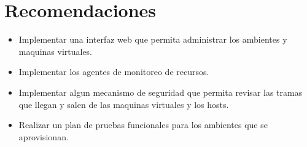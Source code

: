 \chapter{Recomendaciones}
\label{caprecomendaciones}

\begin{itemize}
\item Implementar una interfaz web que permita administrar los ambientes y maquinas virtuales.
\item Implementar los agentes de monitoreo de recursos.
\item Implementar algun mecanismo de seguridad que permita revisar las tramas que llegan y salen de las maquinas virtuales y los hosts.
\item Realizar un plan de pruebas funcionales para los ambientes que se aprovisionan.
\end{itemize}

